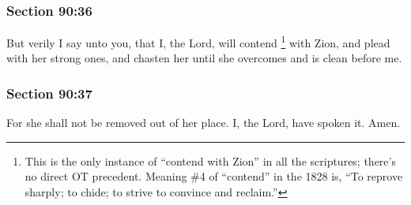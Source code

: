 	\subsubsection{Section 90:36} %
		\label{DC90-36}

		But verily I say unto you, that I, the Lord, will contend%
			\footnote{%
				This is the only instance of ``contend with Zion'' in all the scriptures; there's no direct OT precedent. Meaning \#4 of ``contend'' in the 1828 is, ``To reprove sharply; to chide; to strive to convince and reclaim.''
				}
		with Zion, and plead with her strong ones, and chasten her until she overcomes and is clean before me.


	\subsubsection{Section 90:37} %
		\label{DC90-37}

		For she shall not be removed out of her place.  I, the Lord, have spoken it.  Amen.

